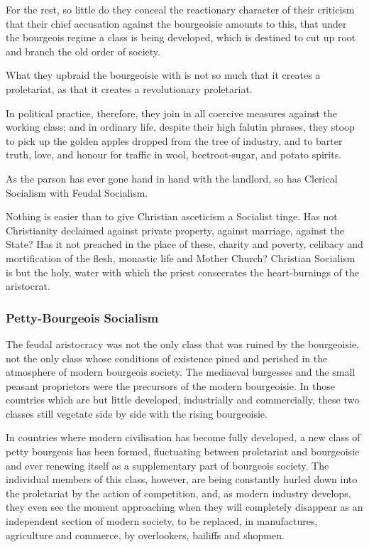 \documentclass[, oneside]{article}   	%
\begin{document}
For the rest, so little do they conceal the reactionary character of their criticism that their chief accusation against the bourgeoisie amounts to this, that under the bourgeois regime a class is being developed, which is destined to cut up root and branch the old order of society.

What they upbraid the bourgeoisie with is not so much that it creates a proletariat, as that it creates a revolutionary proletariat.

In political practice, therefore, they join in all coercive measures against the working class; and in ordinary life, despite their high falutin phrases, they stoop to pick up the golden apples dropped from the tree of industry, and to barter truth, love, and honour for traffic in wool, beetroot-sugar, and potato spirits.

As the parson has ever gone hand in hand with the landlord, so has Clerical Socialism with Feudal Socialism.

Nothing is easier than to give Christian asceticism a Socialist tinge. Has not Christianity declaimed against private property, against marriage, against the State? Has it not preached in the place of these, charity and poverty, celibacy and mortification of the flesh, monastic life and Mother Church? Christian Socialism is but the holy, water with which the priest consecrates the heart-burnings of the aristocrat.

\subsubsection{Petty-Bourgeois Socialism}
The feudal aristocracy was not the only class that was ruined by the bourgeoisie, not the only class whose conditions of existence pined and perished in the atmosphere of modern bourgeois society. The mediaeval burgesses and the small peasant proprietors were the precursors of the modern bourgeoisie. In those countries which are but little developed, industrially and commercially, these two classes still vegetate side by side with the rising bourgeoisie.

In countries where modern civilisation has become fully developed, a new class of petty bourgeois has been formed, fluctuating between proletariat and bourgeoisie and ever renewing itself as a supplementary part of bourgeois society. The individual members of this class, however, are being constantly hurled down into the proletariat by the action of competition, and, as modern industry develops, they even see the moment approaching when they will completely disappear as an independent section of modern society, to be replaced, in manufactures, agriculture and commerce, by overlookers, bailiffs and shopmen.
\end{document}
